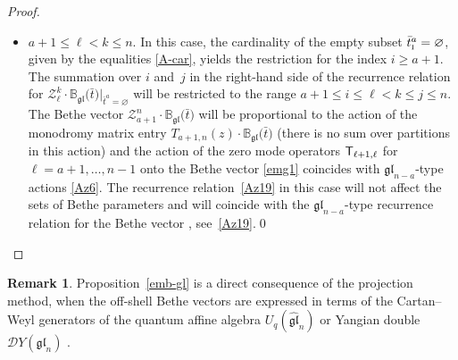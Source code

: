 \documentclass[10pt,a4paper]{amsart}
\newcommand{\so}{\scriptscriptstyle \rm I}
\newcommand{\bt}{{\bar t}}
\theoremstyle{definition}
\newtheorem{rem}[thm]{Remark}
\def\r#1{\eqref{#1}}
\def\sT{{\sf T}}
\def\BBg{\mathbb{B}_{\mathfrak{gl}}}
\def\Z{\mathcal{Z}}
\begin{document}
\begin{proof}
\begin{itemize}
\item $a+1\leq \ell<k\leq n$. In this case, the cardinality of the empty subset
$\bt^a_{\so}=\varnothing$, given by the equalities
\r{A-car}, yields the restriction for the index $i\geq a+1$.
The summation over $i$ and~$j$
in the right-hand side of the recurrence relation for $\Z^k_\ell\cdot
\BBg\bigl(\bt\bigr)|_{\bt^a=\varnothing}$ will be restricted
to the range $a+1\leq i\leq \ell<k\leq j\leq n$.
The Bethe vector $\Z^n_{a+1}\cdot \BBg\bigl(\bt\bigr)$ will be proportional
to the action of the monodromy matrix entry $T_{a+1,n}(z)\cdot\BBg\bigl(\bt\bigr)$
(there is no sum over partitions in this action) and the
action of the zero mode operators $\sT_{\ell+1,\ell}$ for~${\ell=a+1,\dots,n-1}$ onto the Bethe vector \r{emg1} coincides with
$\mathfrak{gl}_{n-a}$-type actions \r{Az6}.
The recurrence relation~\r{Az19} in this case
will not affect the sets of Bethe parameters \smash{$\bigl\{\bt^s\bigr\}_1^{a-1}$} and will
coincide with the $\mathfrak{gl}_{n-a}$-type
recurrence relation for the Bethe vector \smash{$\Z^k_\ell\cdot\BBg\bigl(\bigl\{\bt^s\bigr\}_{a+1}^{n-1}\bigr)$},
see~\eqref{Az19}.\hfill \qed
\end{itemize}\renewcommand{\qed}{}
\end{proof}
\begin{rem}
Proposition~\ref{emb-gl} is a direct consequence
 of the projection method, when
 the off-shell Bethe vectors are expressed in terms of the Cartan--Weyl generators of the quantum affine algebra $U_q(\widehat{\mathfrak{gl}}_n)$ {\rm\cite{KhP-Kyoto}} or
 Yangian double $\mathcal{D}Y(\mathfrak{gl}_n)$ {\rm\cite{HLPRS17}}.\end{rem}
\end{document}
